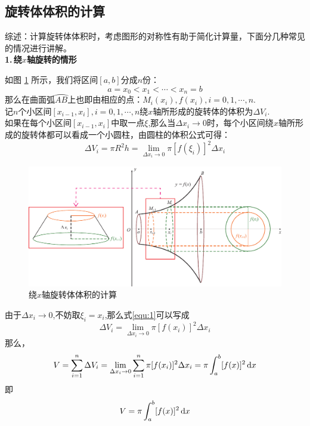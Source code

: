 \subsection{旋转体体积的计算}
综述：计算旋转体体积时，考虑图形的对称性有助于简化计算量，下面分几种常见的情况进行讲解。\\
\textbf{1.$\,$绕$x$轴旋转的情形}
\par 如图 \ref{x旋转} 所示，我们将区间$[a,b]$分成$n$份：
\begin{equation}
	\nonumber
	a=x_0<x_1<\cdots<x_n=b
\end{equation}
那么在曲面弧$\wideparen{AB}$上也即由相应的点：$M_i(x_i),f(x_i),i=0,1,\cdots,n$.\\
记$n$个小区间$[x_{i-1},x_i],i=0,1,\cdots,n$绕$x$轴所形成的旋转体的体积为$\Delta V_i$.\\
如果在每个小区间$[x_{i-1},x_i]$中取一点$\xi$,那么当$\Delta x_i\to0$时，每个小区间绕$x$轴所形成的旋转体都可以看成一个小圆柱，由圆柱的体积公式可得：
\begin{equation}
	\Delta V_i=\pi R^2 h=\lim\limits_{\Delta x_i\to0}\pi[f(\xi_i)]^2\Delta x_i
	\label{equ:1}
\end{equation}
\begin{figure}
	\centering
	\includegraphics[width=0.9\linewidth]{pic/C-4/x旋转体积}
	\vspace*{-1em}
	\caption{绕$x$轴旋转体体积的计算}
	\label{x旋转}
\end{figure}
由于$\Delta x_i\to0$,不妨取$\xi_i=x_i$,那么式\eqref{equ:1}可以写成
\begin{equation}
	\Delta V_i=\lim\limits_{\Delta x_i\to0}\pi[f(x_i)]^2\Delta x_i
\end{equation}
那么，
\begin{equation}
	V=\sum_{i=1}^{n}\Delta V_i=\lim\limits_{\Delta x_i\to0}\sum_{i=1}^{n}\pi[f(x_i)]^2\Delta x_i=\pi\int_{a}^{b}[f(x)]^2\,{\rm{d}} x
\end{equation}
即
\begin{equation}
	V=\pi\int_{a}^{b}[f(x)]^2\,{\rm{d}} x
\end{equation}

